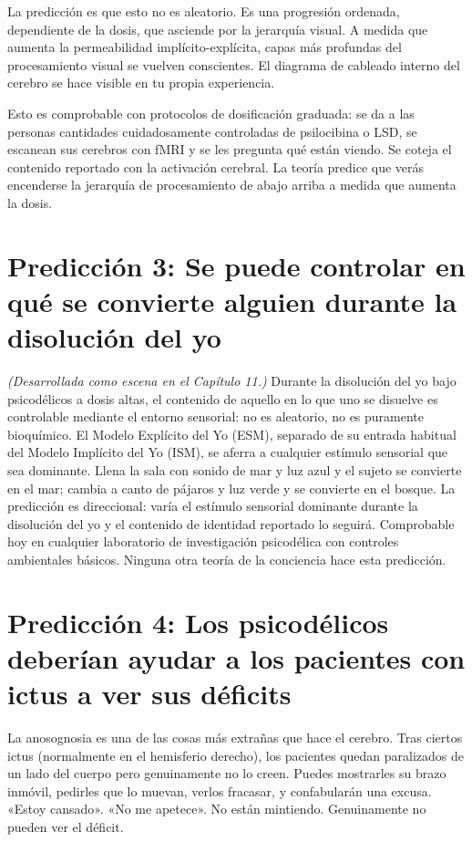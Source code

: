 \documentclass[11pt, twoside, openright]{book}
\begin{document}
La predicción es que esto no es aleatorio. Es una progresión ordenada, dependiente de la dosis, que asciende por la jerarquía visual. A medida que aumenta la permeabilidad implícito-explícita, capas más profundas del procesamiento visual se vuelven conscientes. El diagrama de cableado interno del cerebro se hace visible en tu propia experiencia.

Esto es comprobable con protocolos de dosificación graduada: se da a las personas cantidades cuidadosamente controladas de psilocibina o LSD, se escanean sus cerebros con fMRI y se les pregunta qué están viendo. Se coteja el contenido reportado con la activación cerebral. La teoría predice que verás encenderse la jerarquía de procesamiento de abajo arriba a medida que aumenta la dosis.

\section*{Predicción 3: Se puede controlar en qué se convierte alguien durante la disolución del yo}

\textit{(Desarrollada como escena en el Capítulo 11.)} Durante la disolución del yo bajo psicodélicos a dosis altas, el contenido de aquello en lo que uno se disuelve es controlable mediante el entorno sensorial: no es aleatorio, no es puramente bioquímico. El Modelo Explícito del Yo (ESM), separado de su entrada habitual del Modelo Implícito del Yo (ISM), se aferra a cualquier estímulo sensorial que sea dominante. Llena la sala con sonido de mar y luz azul y el sujeto se convierte en el mar; cambia a canto de pájaros y luz verde y se convierte en el bosque. La predicción es direccional: varía el estímulo sensorial dominante durante la disolución del yo y el contenido de identidad reportado lo seguirá. Comprobable hoy en cualquier laboratorio de investigación psicodélica con controles ambientales básicos. Ninguna otra teoría de la conciencia hace esta predicción.

\section*{Predicción 4: Los psicodélicos deberían ayudar a los pacientes con ictus a ver sus déficits}

La anosognosia es una de las cosas más extrañas que hace el cerebro. Tras ciertos ictus (normalmente en el hemisferio derecho), los pacientes quedan paralizados de un lado del cuerpo pero genuinamente no lo creen. Puedes mostrarles su brazo inmóvil, pedirles que lo muevan, verlos fracasar, y confabularán una excusa. «Estoy cansado». «No me apetece». No están mintiendo. Genuinamente no pueden ver el déficit.
\end{document}
